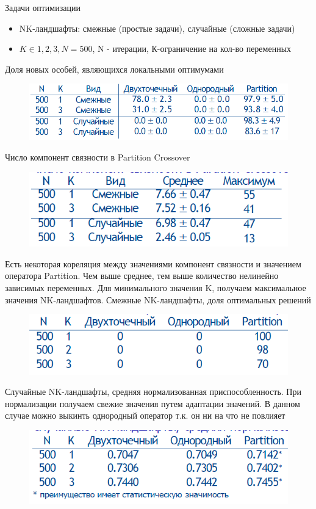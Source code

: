 Задачи оптимизации
\begin{itemize}
    \item NK-ландшафты: смежные (простые задачи), случайные (сложные задачи)
    \item $K\in{1,2,3}, N=500 $, N - итерации, К-ограничение на кол-во переменных
\end{itemize}

Доля новых особей, являющихся локальными оптимумами\\
\begin{figure}[h]
\centering
\includegraphics[width=0.8\linewidth]{images/tbl.PNG}
\end{figure}
Число компонент связности в Partition Crossover\\
\begin{figure}[h]
\centering
\includegraphics[width=0.8\linewidth]{images/tbl2.PNG}
\end{figure}
Есть некоторая кореляция между значениями компонент связности и значением оператора Partition. Чем выше среднее, тем выше количество нелинейно зависимых переменных. Для минимального значения K, получаем максимальное значения NK-ландшафтов. 
Смежные NK-ландшафты, доля оптимальных решений\\
\begin{figure}[h]
\centering
\includegraphics[width=0.8\linewidth]{images/tbl3.PNG}
\end{figure}
Случайные NK-ландшафты, средняя нормализованная приспособленность. При нормализации получаем свежие значения путем адаптации значений. В данном случае можно выкинть однородный оператор т.к. он ни на что не повлияет\\
\begin{figure}[h]
\centering
\includegraphics[width=0.8\linewidth]{images/tbl4.PNG}
\end{figure}
